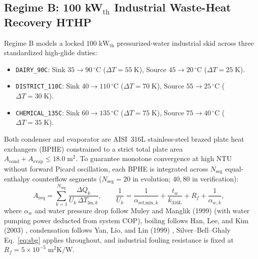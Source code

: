 \documentclass[twocolumn,10pt]{article}
\begin{document}
\subsection{Regime B: 100 kW$_{\text{th}}$ Industrial Waste-Heat Recovery HTHP}
Regime B models a locked $100\;\text{kW}_{\text{th}}$ pressurized-water industrial skid across three standardized high-glide duties:
\begin{itemize}\setlength{\itemsep}{1pt}
  \item \texttt{DAIRY\_90C}: Sink $35\to 90\,^\circ\text{C}$ ($\Delta T=55\;\text{K}$), Source $45\to 20\,^\circ\text{C}$ ($\Delta T=25\;\text{K}$).
  \item \texttt{DISTRICT\_110C}: Sink $40\to 110\,^\circ\text{C}$ ($\Delta T=70\;\text{K}$), Source $55\to 25\,^\circ\text{C}$ ($\Delta T=30\;\text{K}$).
  \item \texttt{CHEMICAL\_135C}: Sink $60\to 135\,^\circ\text{C}$ ($\Delta T=75\;\text{K}$), Source $75\to 40\,^\circ\text{C}$ ($\Delta T=35\;\text{K}$).
\end{itemize}
Both condenser and evaporator are AISI~316L stainless-steel brazed plate heat exchangers (BPHE) constrained to a strict total plate area $A_{\text{cond}}+A_{\text{evap}}\le 18.0\;\text{m}^2$. To guarantee monotone convergence at high NTU without forward Picard oscillation, each BPHE is integrated across $N_{\text{seg}}$ equal-enthalpy counterflow segments ($N_{\text{seg}}=20$ in evolution; $40, 80$ in verification):
\begin{equation}
  A_{\text{req}} = \sum_{k=1}^{N_{\text{seg}}} \frac{\Delta \dot{Q}_k}{U_k\,\Delta T_{\text{lm},k}}, \qquad
  \frac{1}{U_k} = \frac{1}{\alpha_{\text{ref,mix},k}} + \frac{t_w}{k_{\text{316L}}} + R_f + \frac{1}{\alpha_{w,k}},
  \label{eq:bphe}
\end{equation}
where $\alpha_w$ and water pressure drop follow Muley and Manglik (1999) \citep{muley1999manglik} (with water pumping power deducted from system COP), boiling follows Han, Lee, and Kim (2003) \citep{han2003leekim}, condensation follows Yan, Lio, and Lin (1999) \citep{yan1999liolin}, Silver--Bell--Ghaly Eq.~\eqref{eq:sbg} applies throughout, and industrial fouling resistance is fixed at $R_f = 5\times 10^{-5}\;\text{m}^2\text{K/W}$.
\end{document}
